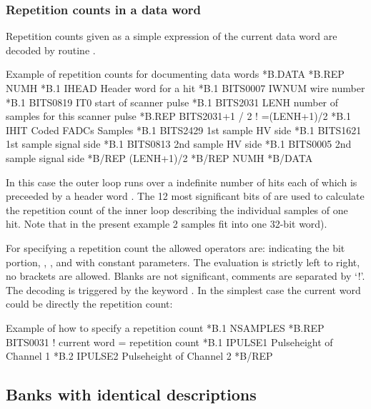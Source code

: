 \subsubsection*{Repetition counts in a data word}
\begin{minipage}{\textwidth}
 
Repetition counts given as a simple expression of the current data
word are decoded by routine .
 
\begin{XMPt}{Example of repetition counts for documenting data words}
*B.DATA
*B.REP  NUMH
*B.1    IHEAD      Header word for a hit
*B.1    BITS0007   IWNUM   wire number
*B.1    BITS0819   IT0     start of scanner pulse
*B.1    BITS2031   LENH    number of samples for this scanner pulse
*B.REP  BITS2031+1 / 2     ! =(LENH+1)/2
*B.1    IHIT       Coded FADCs Samples
*B.1    BITS2429   1st sample HV side
*B.1    BITS1621   1st sample signal side
*B.1    BITS0813   2nd sample HV side
*B.1    BITS0005   2nd sample signal side
*B/REP  (LENH+1)/2
*B/REP  NUMH
*B/DATA
\end{XMPt}
\end{minipage}
 
In this case the outer loop runs over a indefinite number  of
hits each of which is preceeded by a header word .
The 12 most significant bits of 
are used to calculate the repetition count of the inner loop describing
the individual samples of one hit.
Note that in the present example 2 samples fit into one 32-bit word).
 
 
For specifying a repetition count the allowed operators are:
 indicating the bit portion, \Lit{+}, \Lit{-}, \Lit{/} and
\Lit{*} with constant parameters.
The evaluation is strictly left to right, no brackets are allowed.
Blanks are not significant, comments are separated by `!'.
The decoding is triggered by the keyword .
In the simplest case the current word could be directly the repetition
count:
 
\begin{XMPt}{Example of how to specify a repetition count}
*B.1     NSAMPLES
*B.REP   BITS0031      ! current word = repetition count
*B.1     IPULSE1        Pulseheight of Channel 1
*B.2     IPULSE2        Pulseheight of Channel 2
*B/REP
\end{XMPt}
 
\subsection{Banks with identical descriptions}
 

